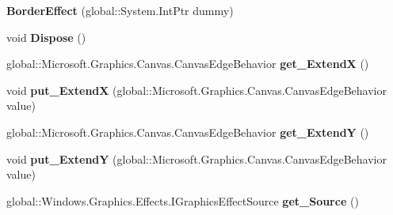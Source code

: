 \begin{DoxyCompactItemize}
{\bfseries Border\+Effect} (global\+::\+System.\+Int\+Ptr dummy)
\item 
\mbox{\label{class_microsoft_1_1_graphics_1_1_canvas_1_1_effects_1_1_border_effect_a8395460dd5965cd4aacc0875a1c0b680}} 
void {\bfseries Dispose} ()
\item 
\mbox{\label{class_microsoft_1_1_graphics_1_1_canvas_1_1_effects_1_1_border_effect_a9b8cb2410a4d2443829d9eeecfd0733e}} 
global\+::\+Microsoft.\+Graphics.\+Canvas.\+Canvas\+Edge\+Behavior {\bfseries get\+\_\+\+ExtendX} ()
\item 
\mbox{\label{class_microsoft_1_1_graphics_1_1_canvas_1_1_effects_1_1_border_effect_af4f6600839db25402d0fb39ed1fd5542}} 
void {\bfseries put\+\_\+\+ExtendX} (global\+::\+Microsoft.\+Graphics.\+Canvas.\+Canvas\+Edge\+Behavior value)
\item 
\mbox{\label{class_microsoft_1_1_graphics_1_1_canvas_1_1_effects_1_1_border_effect_aa62a4c26a2f87c325e90e8a2ef7348d0}} 
global\+::\+Microsoft.\+Graphics.\+Canvas.\+Canvas\+Edge\+Behavior {\bfseries get\+\_\+\+ExtendY} ()
\item 
\mbox{\label{class_microsoft_1_1_graphics_1_1_canvas_1_1_effects_1_1_border_effect_aaae1874ec7b1b2630d7636442f2c79c0}} 
void {\bfseries put\+\_\+\+ExtendY} (global\+::\+Microsoft.\+Graphics.\+Canvas.\+Canvas\+Edge\+Behavior value)
\item 
\mbox{\label{class_microsoft_1_1_graphics_1_1_canvas_1_1_effects_1_1_border_effect_ad3238a486519b9e346560be58abbd303}} 
global\+::\+Windows.\+Graphics.\+Effects.\+I\+Graphics\+Effect\+Source {\bfseries get\+\_\+\+Source} ()
\item 
\mbox{\label{class_microsoft_1_1_graphics_1_1_canvas_1_1_effects_1_1_border_effect_aff45744a28e3679714ecb278ca56bffc}} 

\end{DoxyCompactItemize}
